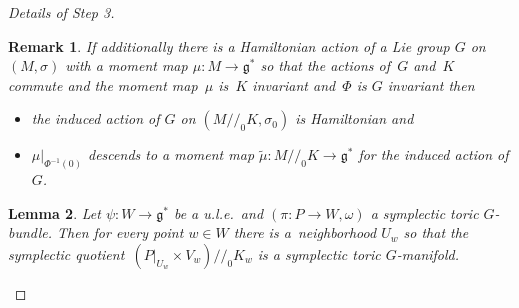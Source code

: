 \documentclass[10pt,a4paper]{amsart}
\numberwithin{equation}{section}
\newtheorem{Lemma}{Lemma}[section]
\newtheorem{Remark}[Lemma]{Remark}
\begin{document}
\begin{proof}[Details of Step 3]
\begin{Remark}\label{rmrk:2.28}
  If additionally there is a Hamiltonian action of a Lie group $G$ on
  $(M,\sigma)$ with a moment map $\mu\colon M\to {\mathfrak g}^*$ so that the actions
  of~$G$ and~$K$ commute and the moment map~$\mu$ is~$K$ invariant
  and~$\Phi$ is $G$ invariant then
\begin{itemize}\itemsep=0pt
\item the induced action of $G$ on $(M/\!/_0 K, \sigma_0)$ is
  Hamiltonian and
\item $\mu|_{\Phi^{-1} (0)}$ descends to a moment map
  $\tilde{\mu}\colon M/\!/_0 K \to {\mathfrak g}^*$ for the induced action of $G$.
\end{itemize}
\end{Remark}


\begin{Lemma}
  Let $\psi\colon W\to {\mathfrak g}^*$ be a u.l.e.\ and $(\pi\colon P\to W,\omega)$ a
  symplectic toric $G$-bundle.  Then for every point $w\in W$ there is a~neighborhood $U_w$ so that the symplectic quotient~$(P|_{U_w} \times
  V_w)/\!/_0 K_w$ is a symplectic toric
  $G$-manifold.
\end{Lemma}


\end{proof}
\end{document}
